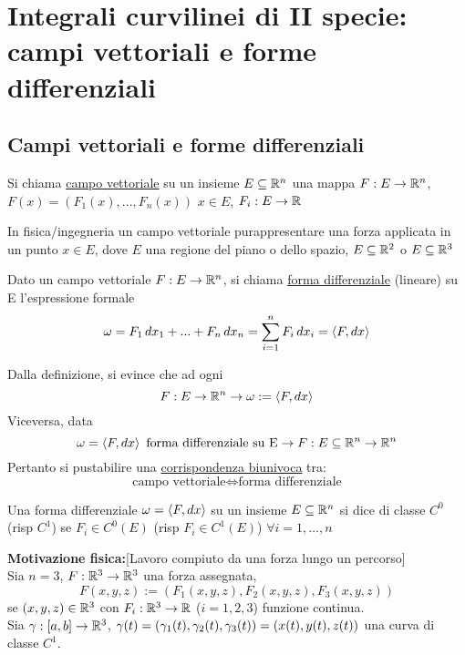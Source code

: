 \section{Integrali curvilinei di II specie: campi vettoriali e forme 
differenziali}
\subsection{Campi vettoriali e forme differenziali}
\begin{definition}
  Si chiama \underline{campo vettoriale} su un insieme $E\subseteq \mathbb{R}^n$ una mappa 
  $F:E\to \mathbb{R}^n$, $F(x) = (F_1(x),...,F_n(x))$ $x \in E$, 
  $F_i : E \to \mathbb{R}$
\end{definition}
\begin{osservazione}
  In fisica/ingegneria un campo vettoriale pu\aco rappresentare una forza applicata in 
  un punto $x\in E$, dove $E$ \ace una regione del piano o dello spazio,
  $E\subseteq \mathbb{R}^2$ o $E\subseteq \mathbb{R}^3$
\end{osservazione}
\begin{definition}
  Dato un campo vettoriale $F:E \to \mathbb{R}^n$, si chiama \underline{forma differenziale} (lineare) su E 
  l'espressione formale
  $$\omega = F_1\,dx_1+...+F_n\,dx_n = \sum_{i=1}^{n}F_i\,dx_i = \left\langle F,dx \right\rangle$$
\end{definition}
\begin{osservazione}
  Dalla definizione, si evince che ad ogni 
  $$F:E\to\mathbb{R}^n \rightarrow \omega:= \left\langle F,dx \right\rangle$$ 
  Viceversa, data 
  $$\omega = \left\langle F,dx \right\rangle \text{ forma differenziale su E} \rightarrow F:E\subseteq\mathbb{R}^n\to\mathbb{R}^n$$
  Pertanto si pu\aco stabilire una \underline{corrispondenza biunivoca} tra:
  $$\text{campo vettoriale} \iff \text{forma differenziale}$$
\end{osservazione}
\begin{definition}
  Una forma differenziale $\omega = \left\langle F,dx \right\rangle$ su un insieme $E \subseteq\mathbb{R}^n$ si dice 
  di classe $C^0$(risp $C^1$) se $F_i \in C^0(E)$ (risp $F_i \in C^1(E)$) $\forall i = 1,...,n$
\end{definition}
\textbf{Motivazione fisica:}[Lavoro compiuto da una forza lungo un percorso] \\
Sia $n=3$, $F:\mathbb{R}^3\to\mathbb{R}^3$ una forza assegnata, 
$$F(x,y,z) := \left(F_1(x,y,z),F_2(x,y,z),F_3(x,y,z)\right)$$
se $(x,y,z)\in\mathbb{R}^3$ con $F_i : \mathbb{R}^3\to\mathbb{R}$ ($i=1,2,3$) funzione continua. \\
Sia $\gamma:[a,b]\to \mathbb{R}^3$, $\gamma(t) = \left(\gamma_1(t), \gamma_2(t),\gamma_3(t)\right) = \left(x(t),y(t),z(t)\right)$
una curva di classe $C^1$.\\
